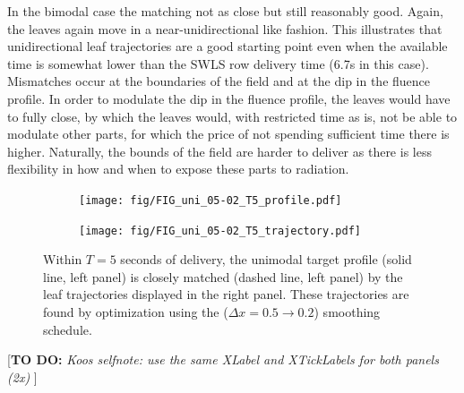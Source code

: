 \documentclass{iopart}
\newcommand{\todo}[1]{{\color{lightblue}\par {[{\bf TO DO: } {\em #1}} ] \\    }}
\begin{document}
In the bimodal case the matching not as close but still reasonably good. 
Again, the leaves again move in a near-unidirectional like fashion.
This illustrates that unidirectional leaf trajectories are a good starting point even when the available time is somewhat lower than the SWLS row delivery time (6.7s in this case).
Mismatches occur at the boundaries of the field and at the dip in the fluence profile.
In order to modulate the dip in the fluence profile, the leaves would have to fully close, by which the leaves would, with restricted time as is, not be able to modulate other parts, for which the price of not spending sufficient time there is higher.
Naturally, the bounds of the field are harder to deliver as there is less flexibility in how and when to expose these parts to radiation. %

\begin{figure}[h]
  \centering
  \begin{subfigure}[b]{0.5\linewidth}
    \centering\texttt{[image: fig/FIG\_uni\_05-02\_T5\_profile.pdf]}
    \caption{\label{fig:sps_umt_prof}}
  \end{subfigure}%
  \begin{subfigure}[b]{0.5\linewidth}
    \centering\texttt{[image: fig/FIG\_uni\_05-02\_T5\_trajectory.pdf]}
    \caption{\label{fig:sps_umt_traj}}
  \end{subfigure}
  \caption{Within $T=5$ seconds of delivery, the unimodal target profile (solid line, left panel) is closely matched (dashed line, left panel) by the leaf trajectories displayed in the right panel. These trajectories are found by optimization using the ($\Delta x = 0.5 \to 0.2$) smoothing schedule.}
  \label{fig:smoothingParamSweep_unimodalTraj}
\end{figure}

\todo{Koos selfnote: use the same XLabel and XTickLabels for both panels (2x)}

\end{document}
